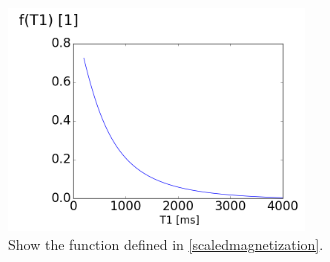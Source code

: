 \documentclass[11pt,a4paper]{article}
\begin{document}
\begin{figure}
\centering
\includegraphics[width=0.70\textwidth]{T1function.png} 
\caption{Show the  function defined in \eqref{scaledmagnetization}. }
\label{figuredti} 
\end{figure}
\end{document}
